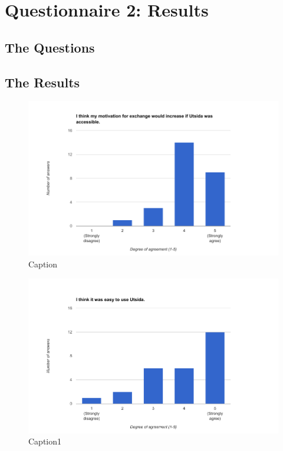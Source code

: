 \chapter{Questionnaire 2: Results}
\label{app:questionnaire1}

\section*{The Questions}

\FloatBarrier
\section*{The Results}

\begin{figure}[h]
    \centering
    \includegraphics[width=1\textwidth]{fig/questionnaire2_diagrams/1.png}
    \caption[]{Caption}
    \label{fig:my_label}
\end{figure}

\begin{figure}[h]
    \centering
    \includegraphics[width=1\textwidth]{fig/questionnaire2_diagrams/2.png}
    \caption[]{Caption1}
    \label{fig:my_label}
\end{figure}

